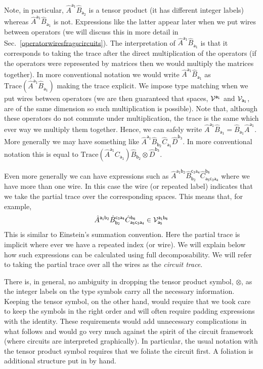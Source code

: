 \documentclass[10pt]{article}
\begin{document}
Note, in particular, $\hat A^\mathsf{a_1} \hat B_\mathsf{a_2}$ is a tensor product (it has different integer labels) whereas $\hat A^\mathsf{a_1} \hat B_\mathsf{a_1}$ is not.  Expressions like the latter appear later when we put wires between operators (we will discuss this in more detail in Sec.\ \ref{operatorwiresfragscircuits}).  The interpretation of $\hat A^\mathsf{a_1} \hat B_\mathsf{a_1}$ is that it corresponds to taking the trace after the direct multiplication of the operators (if the operators were represented by matrices then we would multiply the matrices together).  In more conventional notation we would write $\hat A^\mathsf{a_1} \hat B_\mathsf{a_1}$ as $\text{Trace}(\hat A^\mathsf{a_1} \hat B_\mathsf{a_1})$ making the trace explicit.   We impose type matching when we put wires between operators (we are then guaranteed that spaces, ${\cal V}^\mathsf{a_1}$ and ${\cal V}_\mathsf{a_1}$, are of the same dimension so such multiplication is possible).  Note that, although these operators do not commute under multiplication, the trace is the same which ever way we multiply them together.  Hence, we can safely write $\hat A^\mathsf{a_1} \hat B_\mathsf{a_1}= \hat B_\mathsf{a_1}\hat A^\mathsf{a_1}$.  More generally we may have something like
$\hat A^\mathsf{a_1} \hat B_\mathsf{b_2} \hat C_\mathsf{a_1} \hat D^\mathsf{b_3}$.  In more conventional notation this is equal to
$\text{Trace}(\hat A^\mathsf{a_1} C_\mathsf{a_1}) \hat B_\mathsf{b_2}\otimes \hat D^\mathsf{b_3}$.

Even more generally we can have expressions such as $\hat{A}^\mathsf{a_1b_2}\hat{B}_\mathsf{b_2}^\mathsf{c_3a_4}\hat{C}_\mathsf{a_5c_3a_4}^\mathsf{b_6}$ where we have more than one wire.   In this case the wire (or repeated label) indicates that we take the partial trace over the corresponding spaces.   This means that, for example,
\begin{equation}
\hat{A}^\mathsf{a_1b_2}\hat{B}_\mathsf{b_2}^\mathsf{c_3a_4}\hat{C}_\mathsf{a_5c_3a_4}^\mathsf{b_6} \in {\cal V}_\mathsf{a_5}^\mathsf{a_1b_6}
\end{equation}
This is similar to Einstein's summation convention.  Here the partial trace is implicit where ever we have a repeated index (or wire).  We will explain below how such expressions can be calculated using full decomposability. We will refer to taking the partial trace over all the wires as the \emph{circuit trace}.

There is, in general, no ambiguity in dropping the tensor product symbol, $\otimes$, as the integer labels on the type symbols carry all the necessary information.  Keeping the tensor symbol, on the other hand, would require that we took care to keep the symbols in the right order and will often require padding expressions with the identity.  These requirements would add unnecessary complications in what follows and would go very much against the spirit of the circuit framework (where circuits are interpreted graphically).  In particular, the usual notation with the tensor product symbol requires that we foliate the circuit first.  A foliation is additional structure put in by hand.
\end{document}
